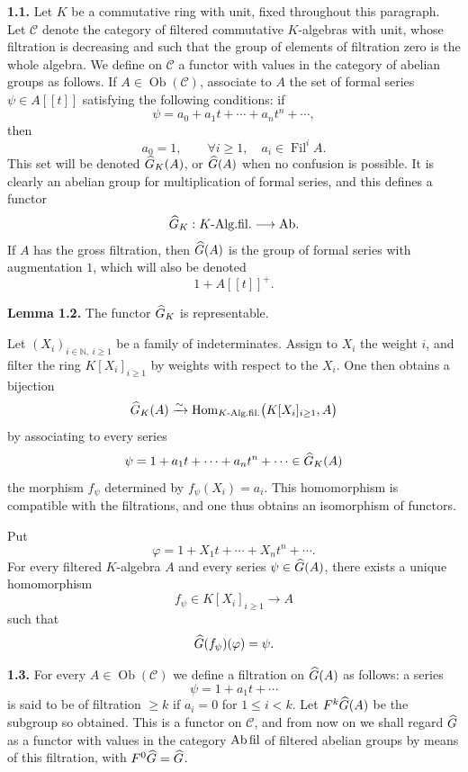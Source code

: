 \documentclass[11pt]{article}
\newcommand{\Fil}{\operatorname{Fil}}
\begin{document}
\textbf{1.1.} Let \(K\) be a commutative ring with unit, fixed throughout this paragraph. Let \(\mathcal C\) denote the category of filtered commutative \(K\)-algebras with unit, whose filtration is decreasing and such that the group of elements of filtration zero is the whole algebra. We define on \(\mathcal C\) a functor with values in the category of abelian groups as follows. If \(A\in\operatorname{Ob}(\mathcal C)\), associate to \(A\) the set of formal series \(\psi\in A[[t]]\) satisfying the following conditions: if
\[
  \psi=a_0+a_1t+\cdots+a_nt^n+\cdots ,
\]
then
\begin{equation}\tag{1.1.1}
  a_0=1,\qquad \forall i\geq 1,\quad a_i\in \Fil^i A .
\end{equation}
This set will be denoted \(\widehat G_K(A)\), or \(\widehat G(A)\) when no confusion is possible. It is clearly an abelian group for multiplication of formal series, and this defines a functor
\[
  \widehat G_K:K\text{-Alg.fil.}\longrightarrow \mathrm{Ab}.
\]
If \(A\) has the gross filtration, then \(\widehat G(A)\) is the group of formal series with augmentation \(1\), which will also be denoted
\[
  1+A[[t]]^+.
\]

\textbf{Lemma 1.2.} The functor \(\widehat G_K\) is representable.

Let \((X_i)_{i\in\mathbb N,\ i\geq 1}\) be a family of indeterminates. Assign to \(X_i\) the weight \(i\), and filter the ring \(K[X_i]_{i\geq 1}\) by weights with respect to the \(X_i\). One then obtains a bijection
\[
  \widehat G_K(A)\xrightarrow{\sim}
  \operatorname{Hom}_{K\text{-Alg.fil.}}\bigl(K[X_i]_{i\geq 1},A\bigr)
\]
by associating to every series
\[
  \psi=1+a_1t+\cdots+a_nt^n+\cdots\in\widehat G_K(A)
\]
the morphism \(f_\psi\) determined by \(f_\psi(X_i)=a_i\). This homomorphism is compatible with the filtrations, and one thus obtains an isomorphism of functors.

Put
\[
  \varphi=1+X_1t+\cdots+X_nt^n+\cdots .
\]
For every filtered \(K\)-algebra \(A\) and every series \(\psi\in\widehat G(A)\), there exists a unique homomorphism
\[
  f_\psi\in K[X_i]_{i\geq 1}\longrightarrow A
\]
such that
\[
  \widehat G(f_\psi)(\varphi)=\psi .
\]

\textbf{1.3.} For every \(A\in\operatorname{Ob}(\mathcal C)\) we define a filtration on \(\widehat G(A)\) as follows: a series
\[
  \psi=1+a_1t+\cdots
\]
is said to be of filtration \(\geq k\) if \(a_i=0\) for \(1\leq i<k\). Let \(F^k\widehat G(A)\) be the subgroup so obtained. This is a functor on \(\mathcal C\), and from now on we shall regard \(\widehat G\) as a functor with values in the category \(\mathrm{Ab\,fil}\) of filtered abelian groups by means of this filtration, with \(F^0\widehat G=\widehat G\).
\end{document}
